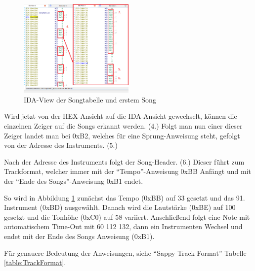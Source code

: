 \documentclass[11pt,a4paper]{scrartcl}
\begin{document}
\begin{figure}
	\vspace{-10pt}
	\begin{center}
		\includegraphics[width=0.5\textwidth]{SongtabellenHeader}
	\end{center}
	\vspace{-10pt}
	\caption{IDA-View der Songtabelle und erstem Song}
	\label{fig:IDA-view}
	\vspace{-40pt}
\end{figure}


Wird jetzt von der HEX-Ansicht auf die IDA-Ansicht gewechselt, k\"onnen die einzelnen Zeiger auf die Songs erkannt werden. (4.)
Folgt man nun einer dieser Zeiger landet man bei 0xB2, welches f\"ur eine Sprung-Anweisung steht, gefolgt von der Adresse des Instruments. (5.)

Nach der Adresse des Instruments folgt der Song-Header. (6.) Dieser f\"uhrt zum Trackformat, welcher immer mit der \enquote{Tempo}-Anweisung 0xBB Anf\"angt und mit der \enquote{Ende des Songs}-Anweisung 0xB1 endet. 

So wird in Abbildung \ref{fig:IDA-view} zun\"achst das Tempo (0xBB) auf 33 gesetzt und das 91. Instrument (0xBD) ausgew\"ahlt. Danach wird die Lautst\"arke (0xBE) auf 100 gesetzt und die Tonh\"ohe (0xC0) auf 58 variiert. Anschlie{\ss}end folgt eine Note mit automatischem Time-Out mit 60 112 132, dann ein Instrumenten Wechsel und endet mit der Ende des Songs Anweisung (0xB1). 

F\"ur genauere Bedeutung der Anweisungen, siehe \enquote{Sappy Track Format}-Tabelle \ref{table:TrackFormat}.

\newpage 
\end{document}
